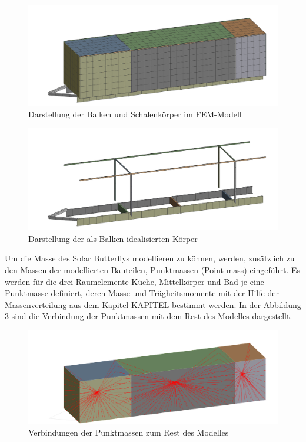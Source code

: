 \begin{figure}[H]
  \centering
  \centering
  \includegraphics[width=.7\linewidth]{04_figures/FEM Mesh1.png}
  \caption{Darstellung der Balken und Schalenkörper im FEM-Modell}
  \label{FEM Mesh1}
\end{figure}
\begin{figure}[H]
  \centering
  \includegraphics[width=.7\linewidth]{04_figures/FEM Mesh3.png}
  \caption{Darstellung der als Balken idealisierten Körper}
  \label{FEM Mesh3}
\end{figure}

Um die Masse des Solar Butterflys modellieren zu können, werden, zusätzlich zu den Massen der modellierten Bauteilen, Punktmassen (Point-mass) eingeführt. Es werden für die drei Raumelemente Küche, Mittelkörper und Bad je eine Punktmasse definiert, deren Masse und Trägheitsmomente mit der Hilfe der Massenverteilung aus dem Kapitel KAPITEL bestimmt werden. In der Abbildung \ref{img:FEM Punktmasse} sind die Verbindung der Punktmassen mit dem Rest des Modelles dargestellt.\\
\begin{figure}[h]
  \centering
  \includegraphics[width=0.7\linewidth]{04_Figures/FEM Punktmasse.png}
  \caption{Verbindungen der Punktmassen zum Rest des Modelles}
  \label{img:FEM Punktmasse}
\end{figure}

